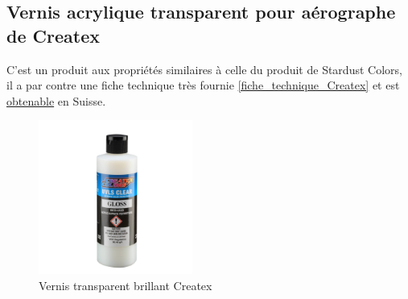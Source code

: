 \subsection{Vernis acrylique transparent pour aérographe de Createx}
C'est un produit aux propriétés similaires à celle du produit de Stardust Colors, il a par contre une fiche technique très fournie \autoref{fiche_technique_Createx} et est \href{https://www.airbrush-shop.ch/contents/de-ch/p6000.html}{obtenable} en Suisse.
\begin{figure}[H]
    \centering
    \includegraphics[width=0.45\textwidth]{assets/figures/etat_art/Createx_bouteille.jpg}
    \caption[Vernis transparent brillant Createx]{Vernis transparent brillant Createx\cite{Bouteille_Createx}}
\end{figure}
\begin{table}[H]
    \centering
    \caption{Résumé des avantages et inconvénients du vernis Createx}
    \label{tab:Createx_vernis}
\end{table}
